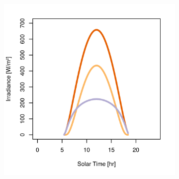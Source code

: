 \begin{figure}[h]
\captionsetup[subfigure]{justification=centering}
\vspace{-2ex}
	\centering
    \setlength{\subfigureWidth}{0.50\textwidth}
    \setlength{\graphicsHeight}{80mm}
    \hypersetup{hidelinks=true}%
  	\begin{subfigure}[t]{\subfigureWidth}
      \centering
  		\includegraphics[height=\graphicsHeight]{sections/mars-solar-energy/solar-radiation/plots/gh-gbh-gdh-variation-1-for-ls-248-phi-20-tau-05-and-albedo-027.png}
  		\label{fig:sub:irradiance-phi-m20}
  	\end{subfigure}\hfill
    \begin{subfigure}[t]{\subfigureWidth}
      \centering

\end{subfigure}
\end{figure}
